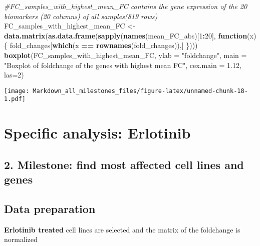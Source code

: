 \documentclass[]{article}
\newenvironment{Shaded}{\begin{snugshade}}{\end{snugshade}}
\newcommand{\CommentTok}[1]{\textcolor[rgb]{0.56,0.35,0.01}{\textit{#1}}}
\newcommand{\ControlFlowTok}[1]{\textcolor[rgb]{0.13,0.29,0.53}{\textbf{#1}}}
\newcommand{\DataTypeTok}[1]{\textcolor[rgb]{0.13,0.29,0.53}{#1}}
\newcommand{\DecValTok}[1]{\textcolor[rgb]{0.00,0.00,0.81}{#1}}
\newcommand{\FloatTok}[1]{\textcolor[rgb]{0.00,0.00,0.81}{#1}}
\newcommand{\KeywordTok}[1]{\textcolor[rgb]{0.13,0.29,0.53}{\textbf{#1}}}
\newcommand{\NormalTok}[1]{#1}
\newcommand{\OperatorTok}[1]{\textcolor[rgb]{0.81,0.36,0.00}{\textbf{#1}}}
\newcommand{\StringTok}[1]{\textcolor[rgb]{0.31,0.60,0.02}{#1}}
\begin{document}
\begin{Shaded}
\begin{Highlighting}[]
\CommentTok{#FC_samples_with_highest_mean_FC contains the gene expression of the 20 biomarkers (20 columns) of all samples(819 rows) }
\NormalTok{FC_samples_with_highest_mean_FC <-}\StringTok{ }\KeywordTok{data.matrix}\NormalTok{(}\KeywordTok{as.data.frame}\NormalTok{(}\KeywordTok{sapply}\NormalTok{(}\KeywordTok{names}\NormalTok{(mean_FC_abs)[}\DecValTok{1}\OperatorTok{:}\DecValTok{20}\NormalTok{], }\ControlFlowTok{function}\NormalTok{(x)\{}
\NormalTok{  fold_changes[}\KeywordTok{which}\NormalTok{(x }\OperatorTok{==}\StringTok{ }\KeywordTok{rownames}\NormalTok{(fold_changes)),]}
\NormalTok{\})))}
\KeywordTok{boxplot}\NormalTok{(FC_samples_with_highest_mean_FC, }
      \DataTypeTok{ylab =} \StringTok{"foldchange"}\NormalTok{, }
      \DataTypeTok{main =} \StringTok{"Boxplot of foldchange of the genes with highest mean FC"}\NormalTok{, }
      \DataTypeTok{cex.main =} \FloatTok{1.12}\NormalTok{,}
      \DataTypeTok{las=}\DecValTok{2}\NormalTok{) }
\end{Highlighting}
\end{Shaded}

\texttt{[image: Markdown\_all\_milestones\_files/figure-latex/unnamed-chunk-18-1.pdf]}

\hypertarget{specific-analysis-erlotinib}{%
\section{\texorpdfstring{\textbf{Specific analysis: Erlotinib
}}{Specific analysis: Erlotinib }}\label{specific-analysis-erlotinib}}

\hypertarget{milestone-find-most-affected-cell-lines-and-genes}{%
\subsection{2. Milestone: find most affected cell lines and
genes}\label{milestone-find-most-affected-cell-lines-and-genes}}

\hypertarget{data-preparation}{%
\subsection{Data preparation}\label{data-preparation}}

\textbf{Erlotinib treated} cell lines are selected and the matrix of the
foldchange is normalized
\end{document}
